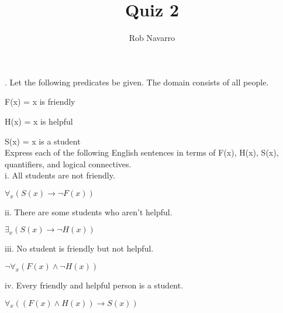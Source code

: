\documentclass[11pt, oneside]{article}   	%
\title{Quiz 2}
\author{Rob Navarro}
\begin{document}
\maketitle
. Let the following predicates be given. The domain consists of all people. 


F(x) = x is friendly

H(x) = x is helpful 

S(x) = x is a student\\


Express each of the following English sentences in terms of F(x), H(x), S(x),\\
\indent quantifiers, and logical connectives.\\

i. All students are not friendly.

$\forall _x(S(x)\to\neg F(x))$

ii. There are some students who aren't helpful.

$\exists _x(S(x)\to\neg H(x))$

iii. No student is friendly but not helpful.

$\neg\forall _x(F(x)\wedge\neg H(x))$

iv. Every friendly and helpful person is a student. 

$\forall _x((F(x)\wedge H(x))\to S(x))$\\\\
\end{document}
